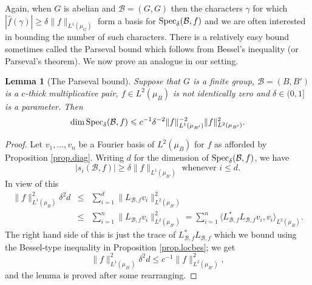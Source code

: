 \documentclass[12pt]{amsart}
\numberwithin{equation}{section}
\theoremstyle{plain}
\newtheorem{lemma}[subsection]{Lemma}
\theoremstyle{definition}
\renewcommand{\leq}{\leqslant}
\renewcommand{\geq}{\geqslant}
\providecommand{\Spec}{\mathop{\rm Spec}\nolimits}
\newcommand{\wh}{\widehat}
\begin{document}
Again, when $G$ is abelian and $\mathcal{B}=(G,G)$ then the characters $\gamma$ for which $|\wh{f}(\gamma)| \geq \delta \|f\|_{L^1(\mu_G)}$ form a basis for $\Spec_\delta(\mathcal{B},f)$ and we are often interested in bounding the number of such characters.  There is a relatively easy bound sometimes called the Parseval bound which follows from Bessel's inequality (or Parseval's theorem).  We now prove an analogue in our setting.
\begin{lemma}[The Parseval bound]\label{lem.pbd}
Suppose that $G$ is a finite group, $\mathcal{B}=(B,B')$ is a $c$-thick multiplicative pair, $f \in L^2(\mu_B)$ is not identically zero and $\delta \in (0,1]$ is a parameter. Then
\begin{equation*}
\dim \Spec_\delta(\mathcal{B},f) \leq c^{-1}\delta^{-2}\|f\|_{L^1(\mu_{B'})}^{-2}\|f\|_{L^2(\mu_{B'})}^2.
\end{equation*}
\end{lemma}
\begin{proof}
Let $v_1,\dots,v_n$ be a Fourier basis of $L^2(\mu_B)$ for $f$ as afforded by Proposition \ref{prop.diag}.  Writing $d$ for the dimension of $\Spec_\delta(\mathcal{B},f)$, we have
\begin{equation*}
|s_i(\mathcal{B},f)| \geq \delta \|f\|_{L^1(\mu_{B'})} \textrm{ whenever } i \leq d.
\end{equation*}
In view of this
\begin{eqnarray*}
\|f\|_{L^1(\mu_B)}^2\delta^2d&\leq &\sum_{i=1}^d{\| L_{\mathcal{B},f}v_i\|_{L^2(\mu_{B'})}^2}\\& \leq& \sum_{i=1}^n{\| L_{\mathcal{B},f}v_i\|_{L^2(\mu_{B'})}^2} = \sum_{i=1}^n{\langle L_{\mathcal{B},f}^*L_{\mathcal{B},f}v_i,v_i\rangle_{L^2(\mu_B)}}.
\end{eqnarray*}
The right hand side of this is just the trace of $L_{\mathcal{B},f}^*L_{\mathcal{B},f}$ which we bound using the Bessel-type inequality in Proposition \ref{prop.locbes}; we get
\begin{equation*}
\|f\|_{L^1(\mu_{B'})}^2\delta^2d \leq c^{-1}\|f\|_{L^2(\mu_{B'})}^2,
\end{equation*}
and the lemma is proved after some rearranging.
\end{proof}
\end{document}
